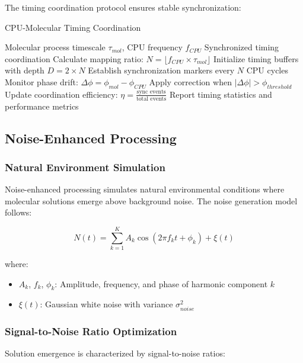 The timing coordination protocol ensures stable synchronization:

\begin{algorithm}[H]
\caption{CPU-Molecular Timing Coordination}
\begin{algorithmic}[1]
\REQUIRE Molecular process timescale $\tau_{mol}$, CPU frequency $f_{CPU}$
\ENSURE Synchronized timing coordination
\STATE Calculate mapping ratio: $N = \lfloor f_{CPU} \times \tau_{mol} \rfloor$
\STATE Initialize timing buffers with depth $D = 2 \times N$
\STATE Establish synchronization markers every $N$ CPU cycles
\STATE Monitor phase drift: $\Delta\phi = \phi_{mol} - \phi_{CPU}$
\STATE Apply correction when $|\Delta\phi| > \phi_{threshold}$
\STATE Update coordination efficiency: $\eta = \frac{\text{sync events}}{\text{total events}}$
\STATE Report timing statistics and performance metrics
\end{algorithmic}
\end{algorithm}

\subsection{Noise-Enhanced Processing}

\subsubsection{Natural Environment Simulation}

Noise-enhanced processing simulates natural environmental conditions where molecular solutions emerge above background noise. The noise generation model follows:

\begin{equation}
N(t) = \sum_{k=1}^{K} A_k \cos(2\pi f_k t + \phi_k) + \xi(t)
\end{equation}

where:
\begin{itemize}
\item $A_k$, $f_k$, $\phi_k$: Amplitude, frequency, and phase of harmonic component $k$
\item $\xi(t)$: Gaussian white noise with variance $\sigma^2_{noise}$
\end{itemize}

\subsubsection{Signal-to-Noise Ratio Optimization}

Solution emergence is characterized by signal-to-noise ratios:

